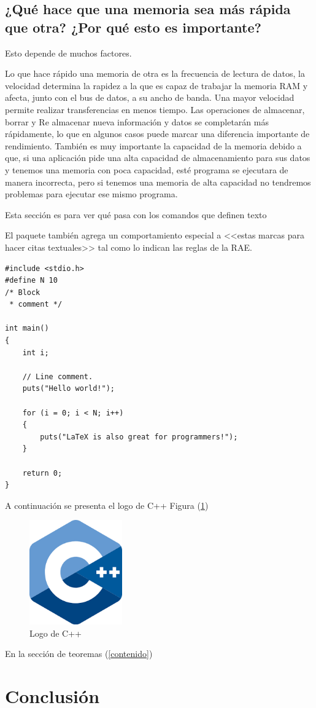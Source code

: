 \subsection{¿Qué hace que una memoria sea más rápida que otra? ¿Por qué esto es importante?}

Esto depende de muchos factores.

Lo que hace rápido una memoria de otra es la frecuencia de lectura de datos, la velocidad determina la rapidez a la que es capaz de trabajar la memoria RAM y afecta, junto con el bus de datos, a su ancho de banda. Una mayor velocidad permite realizar transferencias en menos tiempo. Las operaciones de almacenar, borrar y Re almacenar nueva información y datos se completarán más rápidamente, lo que en algunos casos puede marcar una diferencia importante de rendimiento. También es muy importante la capacidad de la memoria debido a que, si una aplicación pide una alta capacidad de almacenamiento para sus datos y tenemos una memoria con poca capacidad, esté programa se ejecutara de manera incorrecta, pero si tenemos una memoria de alta capacidad no tendremos problemas para ejecutar ese mismo programa.



Esta sección es para ver qué pasa con los comandos 
que definen texto

El paquete también agrega un comportamiento especial 
a <<estas marcas para hacer citas textuales>> tal como 
lo indican las reglas de la RAE. \cite{dirac}

\begin{lstlisting}
#include <stdio.h>
#define N 10
/* Block
 * comment */

int main()
{
    int i;

    // Line comment.
    puts("Hello world!");
    
    for (i = 0; i < N; i++)
    {
        puts("LaTeX is also great for programmers!");
    }

    return 0;
}
\end{lstlisting}

A continuación se presenta el logo de C++ Figura (\ref{fig:cpplogo})

\begin{figure}[h]
\includegraphics[width=4cm]{cpplogo.png}
\centering
\caption{Logo de C++}
\label{fig:cpplogo}
\end{figure}

En la sección de teoremas (\ref{contenido})

\section{Conclusión} \label{conclulsion}





